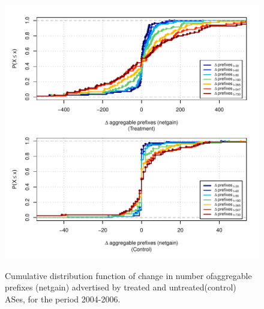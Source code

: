 \clearpage
\vspace*{1.25em}
\begin{figure}[H]
\begin{centering}
\begin{singlespace}
\captionsetup{list=no}
    \includegraphics[width=6in]{figures/behavior-netgain-2004_2006-corr.pdf}
    \vspace{-2em}\\
    \caption{Cumulative distribution function of change in number ofaggregable
    prefixes (netgain) advertised by treated and untreated(control) ASes, for
    the period 2004-2006.}
\end{singlespace}
\end{centering}
\end{figure}

